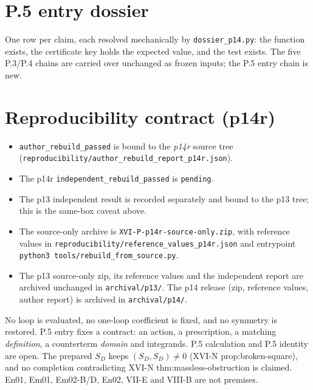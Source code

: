 \section{P.5 entry dossier}\label{sec:p14-dossier}
One row per claim, each resolved mechanically by \texttt{dossier\_p14.py}: the function exists, the certificate key holds
the expected value, and the test exists. The five P.3/P.4 chains are carried over unchanged as frozen inputs; the P.5
entry chain is new.


\section{Reproducibility contract (p14r)}\label{sec:p14-repro}
\begin{itemize}
\item \texttt{author\_rebuild\_passed} is bound to the \emph{p14r} source tree
(\texttt{reproducibility/author\_rebuild\_report\_p14r.json}).
\item The p14r \texttt{independent\_rebuild\_passed} is \texttt{pending}.
\item The p13 independent result is recorded separately and bound to the p13 tree; this is the same-box caveat above.
\item The source-only archive is \texttt{XVI-P-p14r-source-only.zip}, with reference values in
\texttt{reproducibility/reference\_values\_p14r.json} and entrypoint \texttt{python3 tools/rebuild\_from\_source.py}.
\item The p13 source-only zip, its reference values and the independent report are archived unchanged in
\texttt{archival/p13/}. The p14 release (zip, reference values, author report) is archived in \texttt{archival/p14/}.
\end{itemize}

\begin{nonclaim}
No loop is evaluated, no one-loop coefficient is fixed, and no symmetry is restored. P.5 entry fixes a contract: an
action, a prescription, a matching \emph{definition}, a counterterm \emph{domain} and integrands. P.5 calculation and
P.5 identity are open. The prepared $S_D$ keeps $(S_D,S_D)\neq0$ (XVI-N prop:broken-square), and no completion
contradicting XVI-N thm:massless-obstruction is claimed. En01, Em01, Em02-B/D, En02, VII-E and VIII-B are not premises.
\end{nonclaim}
